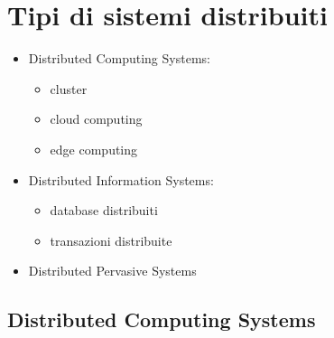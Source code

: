 \section{Tipi di sistemi distribuiti}
\begin{itemize}
    \item Distributed Computing Systems: 
    \begin{itemize}
        \item cluster
        \item cloud computing
        \item edge computing
    \end{itemize}
    \item Distributed Information Systems:
    \begin{itemize}
        \item database distribuiti
        \item transazioni distribuite
    \end{itemize}
    \item Distributed Pervasive Systems
\end{itemize}

\subsection{Distributed Computing Systems}
